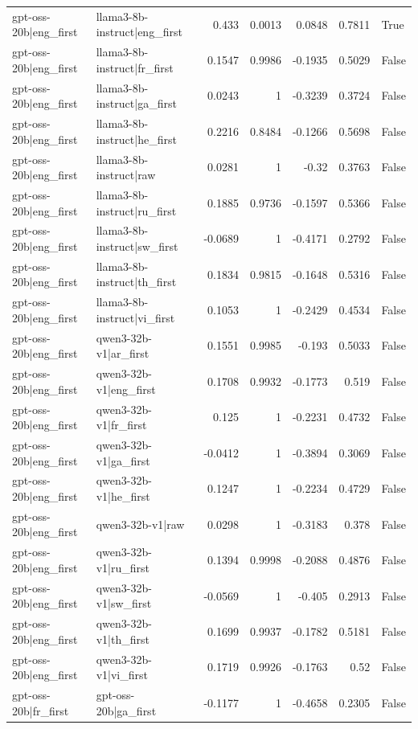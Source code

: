 \begin{table}
\begin{tabular}{l l r r r r l}
gpt-oss-20b|eng_first & llama3-8b-instruct|eng_first & 0.433 & 0.0013 & 0.0848 & 0.7811 & True \\
gpt-oss-20b|eng_first & llama3-8b-instruct|fr_first & 0.1547 & 0.9986 & -0.1935 & 0.5029 & False \\
gpt-oss-20b|eng_first & llama3-8b-instruct|ga_first & 0.0243 & 1 & -0.3239 & 0.3724 & False \\
gpt-oss-20b|eng_first & llama3-8b-instruct|he_first & 0.2216 & 0.8484 & -0.1266 & 0.5698 & False \\
gpt-oss-20b|eng_first & llama3-8b-instruct|raw & 0.0281 & 1 & -0.32 & 0.3763 & False \\
gpt-oss-20b|eng_first & llama3-8b-instruct|ru_first & 0.1885 & 0.9736 & -0.1597 & 0.5366 & False \\
gpt-oss-20b|eng_first & llama3-8b-instruct|sw_first & -0.0689 & 1 & -0.4171 & 0.2792 & False \\
gpt-oss-20b|eng_first & llama3-8b-instruct|th_first & 0.1834 & 0.9815 & -0.1648 & 0.5316 & False \\
gpt-oss-20b|eng_first & llama3-8b-instruct|vi_first & 0.1053 & 1 & -0.2429 & 0.4534 & False \\
gpt-oss-20b|eng_first & qwen3-32b-v1|ar_first & 0.1551 & 0.9985 & -0.193 & 0.5033 & False \\
gpt-oss-20b|eng_first & qwen3-32b-v1|eng_first & 0.1708 & 0.9932 & -0.1773 & 0.519 & False \\
gpt-oss-20b|eng_first & qwen3-32b-v1|fr_first & 0.125 & 1 & -0.2231 & 0.4732 & False \\
gpt-oss-20b|eng_first & qwen3-32b-v1|ga_first & -0.0412 & 1 & -0.3894 & 0.3069 & False \\
gpt-oss-20b|eng_first & qwen3-32b-v1|he_first & 0.1247 & 1 & -0.2234 & 0.4729 & False \\
gpt-oss-20b|eng_first & qwen3-32b-v1|raw & 0.0298 & 1 & -0.3183 & 0.378 & False \\
gpt-oss-20b|eng_first & qwen3-32b-v1|ru_first & 0.1394 & 0.9998 & -0.2088 & 0.4876 & False \\
gpt-oss-20b|eng_first & qwen3-32b-v1|sw_first & -0.0569 & 1 & -0.405 & 0.2913 & False \\
gpt-oss-20b|eng_first & qwen3-32b-v1|th_first & 0.1699 & 0.9937 & -0.1782 & 0.5181 & False \\
gpt-oss-20b|eng_first & qwen3-32b-v1|vi_first & 0.1719 & 0.9926 & -0.1763 & 0.52 & False \\
gpt-oss-20b|fr_first & gpt-oss-20b|ga_first & -0.1177 & 1 & -0.4658 & 0.2305 & False \\

\end{tabular}
\end{table}
